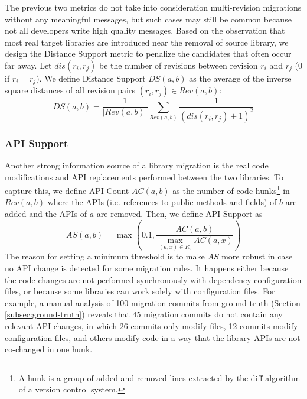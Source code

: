 \documentclass[conference, 10pt]{IEEEtran}
\begin{document}
The previous two metrics do not take into consideration multi-revision migrations without any meaningful messages, but such cases may still be common because not all developers write high quality messages.
Based on the observation that most real target libraries are introduced near the removal of source library, we design the Distance Support metric to penalize the candidates that often occur far away.
Let $dis(r_i, r_j)$ be the number of revisions between revision $r_i$ and $r_j$ ($0$ if $r_i=r_j$). We define Distance Support $DS(a,b)$ as the average of the inverse square distances of all revision pairs $(r_i, r_j) \in Rev(a,b)$:
\begin{equation}
    DS(a,b)=\frac{1}{|Rev(a,b)|} \sum_{ Rev(a,b)}\frac{1}{(dis(r_i,r_j)+1)^2}
\end{equation}

\subsubsection{API Support}

Another strong information source of a library migration is the real code modifications and API replacements performed between the two libraries. To capture this, we define API Count $AC(a,b)$ as the number of code hunks\footnote{A hunk is a group of added and removed lines extracted by the diff algorithm of a version control system.} in $Rev(a,b)$ where the APIs (i.e. references to public methods and fields) of $b$ are added and the APIs of $a$ are removed. Then, we define API Support as
\begin{equation}
    AS(a,b)=\max(0.1,\frac{AC(a,b)}{\max_{(a,x)\in R_c}AC(a,x)})
\end{equation}
The reason for setting a minimum threshold is to make $AS$ more robust in case no API change is detected for some migration rules. It happens either because the code changes are not performed synchronously with dependency configuration files, or because some libraries can work solely with configuration files.
For example, a manual analysis of 100 migration commits from ground truth (Section \ref{subsec:ground-truth}) reveals that 45 migration commits do not contain any relevant API changes, in which 26 commits only modify  files, 12 commits modify configuration files, and others modify code in a way that the library APIs are not co-changed in one hunk.
\end{document}

